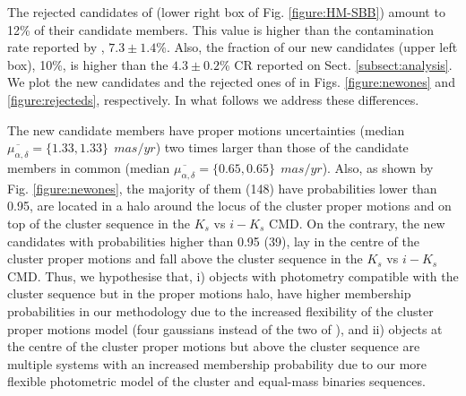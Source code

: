 The rejected candidates of \citet{Bouy2015} (lower right box of Fig. \ref{figure:HM-SBB}) amount to 12\% of their candidate members. This value is higher than the contamination rate reported by \citet{Sarro2014}, $7.3\pm1.4$\%. Also, the fraction of our new candidates (upper left box), 10\%, is higher than the $4.3\pm0.2$\% CR reported on Sect. \ref{subsect:analysis}. We plot the new candidates and the rejected ones of \citet{Bouy2015} in Figs. \ref{figure:newones} and \ref{figure:rejecteds}, respectively. In what follows we address these differences.

The new candidate members have proper motions uncertainties (median $\overline{\mu_{\alpha,\delta}}=\{1.33,1.33\} \ \ mas/yr$) two times larger than those of the candidate members in common (median $\overline{\mu_{\alpha,\delta}}=\{0.65,0.65\} \ \ mas/yr$). Also, as shown by Fig. \ref{figure:newones}, the majority of them (148) have probabilities lower than 0.95, are located in a halo around the locus of the cluster proper motions and on top of the cluster sequence in the $K_s$ vs $i-K_s$ CMD. On the contrary, the new candidates with probabilities higher than 0.95 (39), lay in the centre of the cluster proper motions and fall above the cluster sequence in the $K_s$ vs $i-K_s$ CMD. Thus, we hypothesise that, i) objects with photometry compatible with the cluster sequence but in the proper motions halo, have higher membership probabilities in our methodology due to the increased flexibility of the cluster proper motions model (four gaussians instead of the two of \citet{Bouy2015}), and ii) objects at the centre of the cluster proper motions but above the cluster sequence are multiple systems \cite[probably triple systems which can amount to 4\% of the population][]{Duquennoy1991} with an increased membership probability due to our more flexible photometric model of the cluster and equal-mass binaries sequences.

